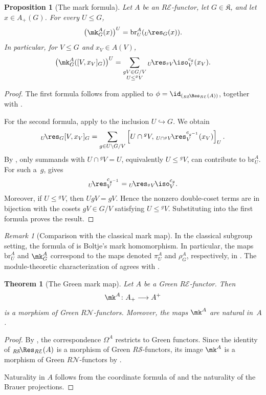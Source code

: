 \documentclass{amsart}
\numberwithin{equation}{section}%
\newtheorem{Thm}[equation]{Theorem}
\newtheorem{Prop}[equation]{Proposition}
\theoremstyle{remark}
\newtheorem{Rem}[equation]{Remark}
\theoremstyle{definition}
\newcommand{\e}{\mathcal E}
\newcommand{\s}{\mathcal S}
\newcommand{\n}{\mathcal N}
\newcommand{\lres}[1]{{}_{#1}\!\res}
\newcommand{\liso}[1]{{}_{#1}\!\iso}
\newcommand{\iRes}[2]{{}_{#1}\!\Res_{#2}}
\newcommand{\br}{\text{br}}
\begin{document}
%
\begin{Prop}[The mark formula]
\label{prop:mark-formula}
Let $A$ be an $R\e$-functor, let $G\in\mathfrak K$, and let
$x\in A_+(G)$.
For every $U\leq G$,
%
\[
\bigl(\mk_G^A(x)\bigr)^U
=
\br_U^A(\lres{U}_G(x)).
\]
%
In particular, for $V\leq G$ and $x_V\in A(V)$,
%
\[
\bigl(\mk_G^A([V,x_V]_G)\bigr)^U
=
\sum_{\substack{
		gV\in G/V\\
		U\leq{}^gV
}}
\lres{U}_{{}^gV}
{}\liso{}_V^{c_g}(x_V).
\]
\end{Prop}
%
\begin{proof}
The first formula follows from
 applied to
$\phi=\id_{(\iRes{R\s}{R\e}(A))}$, together with
.
	
For the second formula, apply
 to the inclusion
$U\hookrightarrow G$.
We obtain
%
\[
\lres{U}_G[V,x_V]_G
=
\sum_{g\in U\backslash G/V}
\left[
U\cap{}^gV,\,\lres{U\cap{}^gV}_V^{c_{g^{-1}}}(x_V)
\right]_U.
\]
%
By , only summands
with $U\cap{}^gV=U$, equivalently
$U\leq{}^gV$, can contribute to $\br_U^A$.
For such a~$g$,
 gives
%
\[
\lres{U}_V^{c_{g^{-1}}}
=
\lres{U}_{{}^gV}\liso{}_V^{c_g}.
\]
%
Moreover, if $U\leq{}^gV$, then
$UgV=gV$.
Hence the nonzero double-coset terms are in bijection with the cosets
$gV\in G/V$ satisfying $U\leq{}^gV$.
Substituting into the first formula proves the result.
\end{proof}
%
\begin{Rem}[Comparison with the classical mark map]
\label{rem:classical-mark-map}
In the classical subgroup setting, the formula of
 is Boltje's mark homomorphism.
In particular, the maps $\br_U^A$ and $\mk_G^A$ correspond to
the maps denoted $\pi_U^A$ and $\rho_G^A$, respectively, in
\cite[Sec.~2.3]{Boltje98a}.
The module-theoretic characterization of
 agrees with
\cite[Corollary~5.10]{Coskun07}.
\end{Rem}
%
\begin{Thm}[The Green mark map]
\label{thm:Green-mark-map}
Let $A$ be a Green $R\e$-functor.
Then
%
\[
\mk^A\colon A_+\longrightarrow A^+
\]
%
is a morphism of Green $R\n$-functors.
Moreover, the maps $\mk^A$ are natural in~$A$.
\end{Thm}
%
\begin{proof}
By ,
the correspondence $\Omega^A$ restricts to Green functors.
Since the identity of
$\iRes{R\s}{R\e}(A)$ is a morphism of Green
$R\s$-functors, its image $\mk^A$ is a morphism
of Green $R\n$-functors by .

Naturality in $A$ follows from the coordinate formula of
 and the naturality of the
Brauer projections.
\end{proof}
%
\end{document}
